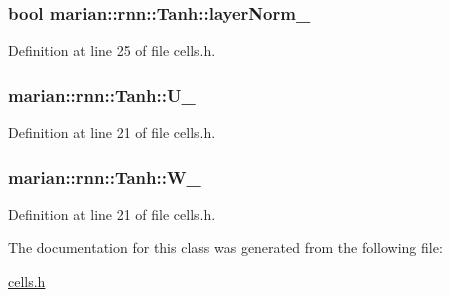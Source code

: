 \subsubsection[{\texorpdfstring{layer\+Norm\+\_\+}{layerNorm_}}]{\setlength{\rightskip}{0pt plus 5cm}bool marian\+::rnn\+::\+Tanh\+::layer\+Norm\+\_\+\hspace{0.3cm}{\ttfamily [private]}}\hypertarget{classmarian_1_1rnn_1_1Tanh_a2f040a380c52e0d19f84e155d14f3967}{}\label{classmarian_1_1rnn_1_1Tanh_a2f040a380c52e0d19f84e155d14f3967}


Definition at line 25 of file cells.\+h.

\subsubsection[{\texorpdfstring{U\+\_\+}{U_}}]{ marian\+::rnn\+::\+Tanh\+::\+U\+\_\+\hspace{0.3cm}{\ttfamily [private]}}\hypertarget{classmarian_1_1rnn_1_1Tanh_a326263946a945185e8cf5c587383aa54}{}\label{classmarian_1_1rnn_1_1Tanh_a326263946a945185e8cf5c587383aa54}


Definition at line 21 of file cells.\+h.

\subsubsection[{\texorpdfstring{W\+\_\+}{W_}}]{ marian\+::rnn\+::\+Tanh\+::\+W\+\_\+\hspace{0.3cm}{\ttfamily [private]}}\hypertarget{classmarian_1_1rnn_1_1Tanh_af63a9f22efde5a4011105da5c416bae9}{}\label{classmarian_1_1rnn_1_1Tanh_af63a9f22efde5a4011105da5c416bae9}


Definition at line 21 of file cells.\+h.



The documentation for this class was generated from the following file\+:\begin{DoxyCompactItemize}
\item 
\hyperlink{cells_8h}{cells.\+h}\end{DoxyCompactItemize}
